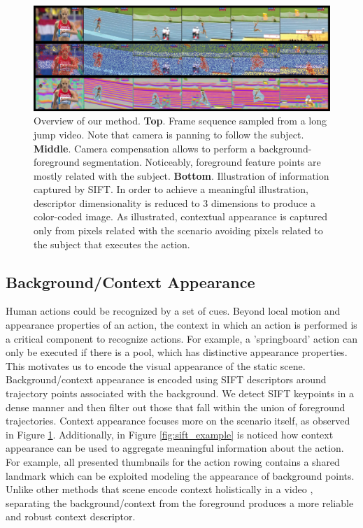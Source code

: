 \begin{figure}[t!]
\begin{center}
\includegraphics[width=0.98\linewidth]{fig/approach.png}
\end{center}
\caption{Overview of our method. \textbf{Top}. Frame sequence sampled from a long jump video. Note that camera is panning to follow the subject. \textbf{Middle}. Camera compensation allows to perform a background-foreground segmentation. Noticeably, foreground feature points are mostly related with the subject. \textbf{Bottom}. Illustration of information captured by SIFT. In order to achieve a meaningful illustration, descriptor dimensionality is reduced to 3 dimensions to produce a color-coded image. As illustrated, contextual appearance is captured only from pixels related with the scenario \ie avoiding pixels related to the subject that executes the action.}
\label{fig:approach}
\end{figure}


\subsection{Background/Context Appearance}
Human actions could be recognized by a set of cues. Beyond local motion and appearance properties of an action, the context in which an action is performed is a critical component to recognize actions. For example, a 'springboard' action can only be executed if there is a pool, which has distinctive appearance properties. This motivates us to encode the visual appearance of the static scene. Background/context appearance is encoded using SIFT descriptors \cite{lowe2004} around trajectory points associated with the background. We detect SIFT keypoints in a dense manner and then filter out those that fall within the union of foreground trajectories. Context appearance focuses more on the scenario itself, as observed in Figure \ref{fig:approach}. Additionally, in Figure \ref{fig:sift_example} is noticed how context appearance can be used to aggregate meaningful information about the action. For example, all presented thumbnails for the action rowing contains a shared landmark which can be exploited modeling the appearance of background points.  Unlike other methods that scene encode context holistically in a video \cite{marszalek2009}, separating the background/context from the foreground produces a more reliable and robust context descriptor.

